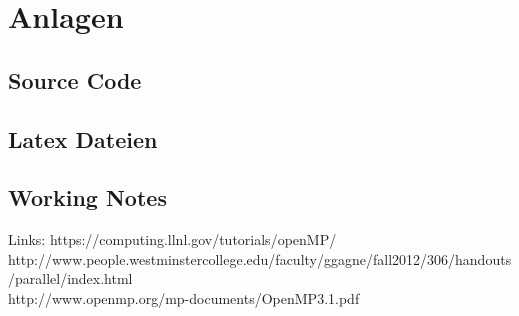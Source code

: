 \documentclass{lni}
\begin{document}
\pagebreak

{}


\newpage

\listoffigures

\listoftables

\section{Anlagen}
\setcounter{subsection}{0} %
\minitoc

\nomtcpagenumbers %

\subsection{Source Code}

\subsection{Latex Dateien}


\subsection{Working Notes}
Links: 
https://computing.llnl.gov/tutorials/openMP/ \\
http://www.people.westminstercollege.edu/faculty/ggagne/fall2012/306/handouts/parallel/index.html \\
http://www.openmp.org/mp-documents/OpenMP3.1.pdf \\
\end{document}
